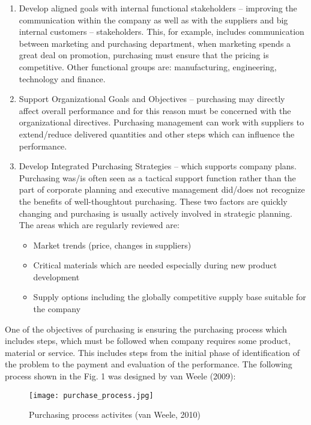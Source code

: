 \documentclass[oneside,12pt]{article}%
\begin{document}
\begin{enumerate}
  \item Develop aligned goals with internal functional stakeholders – improving the communication within the company as well as with the suppliers and big internal customers – stakeholders. This, for example, includes communication between marketing and purchasing department, when marketing spends a great deal on promotion, purchasing must ensure that the pricing is competitive. Other functional groups are: manufacturing, engineering, technology and finance.

  \item Support Organizational Goals and Objectives – purchasing may directly affect overall performance and for this reason must be concerned with the organizational directives. Purchasing management can work with suppliers to extend/reduce delivered quantities and other steps which can influence the performance.

  \item Develop Integrated Purchasing Strategies – which supports company plans. Purchasing was/is often seen as a tactical support function rather than the part of corporate planning and executive management did/does not recognize the benefits of well-thoughtout purchasing. These two factors are quickly changing and purchasing is usually actively involved in strategic planning. The areas which are regularly reviewed are:
  \begin{itemize}
    \item Market trends (price, changes in suppliers)
    \item Critical materials which are needed especially during new product development
    \item Supply options including the globally competitive supply base suitable for the company
  \end{itemize}

\end{enumerate}
  One of the objectives of purchasing is ensuring the purchasing process which includes steps, which must be followed when company requires some product, material or service. This includes steps from the initial phase of identification of the problem to the payment and evaluation of the performance. The following process shown in the Fig. 1 was designed by van Weele (2009):


\begin{figure}[ht!]
  \texttt{[image: purchase\_process.jpg]}
  \caption{Purchasing process activites (van Weele, 2010)}
\end{figure}
\end{document}
